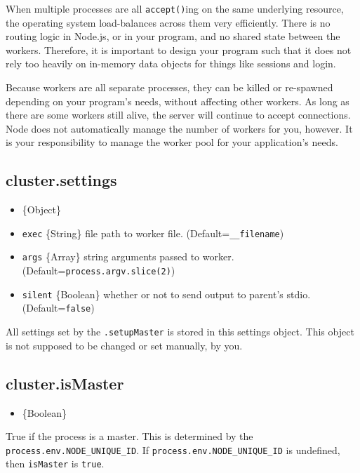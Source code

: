 When multiple processes are all \texttt{accept()}ing on the same
underlying resource, the operating system load-balances across them very
efficiently. There is no routing logic in Node.js, or in your program,
and no shared state between the workers. Therefore, it is important to
design your program such that it does not rely too heavily on in-memory
data objects for things like sessions and login.

Because workers are all separate processes, they can be killed or
re-spawned depending on your program's needs, without affecting other
workers. As long as there are some workers still alive, the server will
continue to accept connections. Node does not automatically manage the
number of workers for you, however. It is your responsibility to manage
the worker pool for your application's needs.

\subsection{cluster.settings}

\begin{itemize}
\item
  \{Object\}
\item
  \texttt{exec} \{String\} file path to worker file.
  (Default=\texttt{\_\_filename})
\item
  \texttt{args} \{Array\} string arguments passed to worker.
  (Default=\texttt{process.argv.slice(2)})
\item
  \texttt{silent} \{Boolean\} whether or not to send output to parent's
  stdio. (Default=\texttt{false})
\end{itemize}

All settings set by the \texttt{.setupMaster} is stored in this settings
object. This object is not supposed to be changed or set manually, by
you.

\subsection{cluster.isMaster}

\begin{itemize}
\item
  \{Boolean\}
\end{itemize}

True if the process is a master. This is determined by the
\texttt{process.env.NODE\_UNIQUE\_ID}. If
\texttt{process.env.NODE\_UNIQUE\_ID} is undefined, then
\texttt{isMaster} is \texttt{true}.

